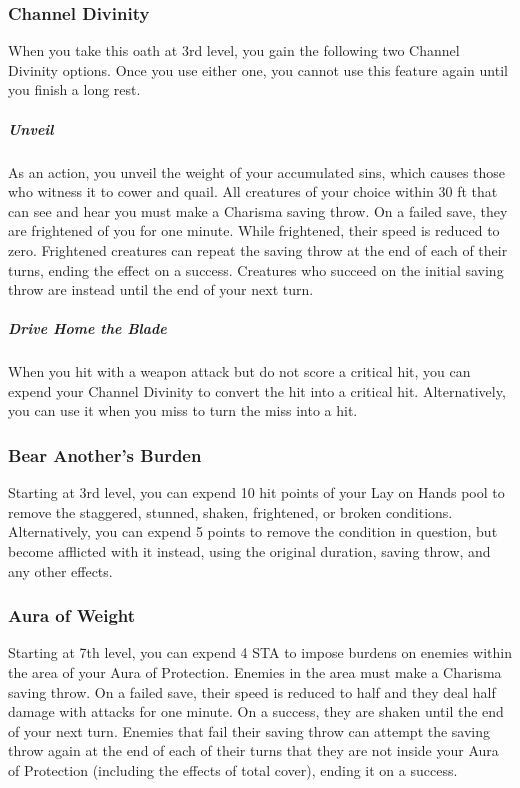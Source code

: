 \subsubsection{Channel Divinity}
When you take this oath at 3rd level, you gain the following two Channel Divinity options. Once you use either one, you cannot use this feature again until you finish a long rest.
\subparagraph*{Unveil}
As an action, you unveil the weight of your accumulated sins, which causes those who witness it to cower and quail. All creatures of your choice within 30 ft that can see and hear you must make a Charisma saving throw. On a failed save, they are frightened of you for one minute. While frightened, their speed is reduced to zero. Frightened creatures can repeat the saving throw at the end of each of their turns, ending the effect on a success. Creatures who succeed on the initial saving throw are instead  until the end of your next turn.

\subparagraph*{Drive Home the Blade} When you hit with a weapon attack but do not score a critical hit, you can expend your Channel Divinity to convert the hit into a critical hit. Alternatively, you can use it when you miss to turn the miss into a hit.

\subsubsection{Bear Another's Burden}
Starting at 3rd level, you can expend 10 hit points of your Lay on Hands pool to remove the staggered, stunned, shaken, frightened, or broken conditions. Alternatively, you can expend 5 points to remove the condition in question, but become afflicted with it instead, using the original duration, saving throw, and any other effects.

\subsubsection{Aura of Weight}
Starting at 7th level, you can expend 4 STA to impose burdens on enemies within the area of your Aura of Protection. Enemies in the area must make a Charisma saving throw. On a failed save, their speed is reduced to half and they deal half damage with attacks for one minute. On a success, they are shaken until the end of your next turn. Enemies that fail their saving throw can attempt the saving throw again at the end of each of their turns that they are not inside your Aura of Protection (including the effects of total cover), ending it on a success.

